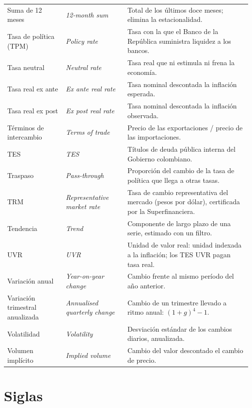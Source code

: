 \begin{longtable}{>{\raggedright\arraybackslash}p{3.2cm}>{\raggedright\arraybackslash\itshape}p{3.2cm}>{\raggedright\arraybackslash}p{8.2cm}}
Suma de 12 meses & 12-month sum & Total de los últimos doce meses; elimina la estacionalidad.\\
Tasa de política (TPM) & Policy rate & Tasa con la que el Banco de la República suministra liquidez a los bancos.\\
Tasa neutral & Neutral rate & Tasa real que ni estimula ni frena la economía.\\
Tasa real ex ante & Ex ante real rate & Tasa nominal descontada la inflación esperada.\\
Tasa real ex post & Ex post real rate & Tasa nominal descontada la inflación observada.\\
Términos de intercambio & Terms of trade & Precio de las exportaciones / precio de las importaciones.\\
TES & TES & Títulos de deuda pública interna del Gobierno colombiano.\\
Traspaso & Pass-through & Proporción del cambio de la tasa de política que llega a otras tasas.\\
TRM & Representative market rate & Tasa de cambio representativa del mercado (pesos por dólar), certificada por la Superfinanciera.\\
Tendencia & Trend & Componente de largo plazo de una serie, estimado con un filtro.\\
UVR & UVR & Unidad de valor real: unidad indexada a la inflación; los TES UVR pagan tasa real.\\
Variación anual & Year-on-year change & Cambio frente al mismo período del año anterior.\\
Variación trimestral anualizada & Annualised quarterly change & Cambio de un trimestre llevado a ritmo anual: $(1+g)^4-1$.\\
Volatilidad & Volatility & Desviación estándar de los cambios diarios, anualizada.\\
Volumen implícito & Implied volume & Cambio del valor descontado el cambio de precio.\\
\end{longtable}
\normalsize

\chapter{Siglas}
\label{es:r:siglas}

